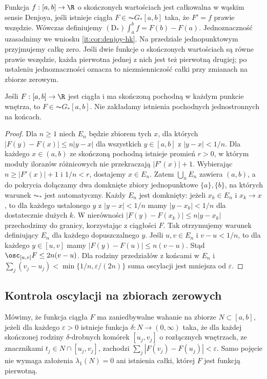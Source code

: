 \begin{definicja}\label{it:def:denjoy-narrow}
Funkcja $f:[a,b]\to\R$ o skończonych wartościach jest całkowalna w wąskim sensie Denjoya, jeśli istnieje ciągła $F\in\AC G_*[a,b]$ taka, że $F'=f$ prawie wszędzie. Wówczas definiujemy $(\mathrm D_*)\int_a^b f=F(b)-F(a)$. Jednoznaczność uzasadnimy we wniosku \ref{it:cor:denjoy-hk}. Na przedziale jednopunktowym przyjmujemy całkę zero. Jeśli dwie funkcje o skończonych wartościach są równe prawie wszędzie, każda pierwotna jednej z nich jest też pierwotną drugiej; po ustaleniu jednoznaczności oznacza to niezmienniczość całki przy zmianach na zbiorze zerowym.
\end{definicja}
\begin{twierdzenie}\label{it:thm:differentiable-acgstar}
Jeśli $F:[a,b]\to\R$ jest ciągła i ma skończoną pochodną w każdym punkcie wnętrza, to $F\in\AC G_*[a,b]$. Nie zakładamy istnienia pochodnych jednostronnych na końcach.
\end{twierdzenie}
\begin{proof}
Dla $n\ge1$ niech $E_n$ będzie zbiorem tych $x$, dla których $|F(y)-F(x)|\le n|y-x|$ dla wszystkich $y\in[a,b]$ z $|y-x|<1/n$. Dla każdego $x\in(a,b)$ ze skończoną pochodną istnieje promień $r>0$, w którym moduły ilorazów różnicowych nie przekraczają $|F'(x)|+1$. Wybierając $n\ge |F'(x)|+1$ i $1/n<r$, dostajemy $x\in E_n$. Zatem $\bigcup_n E_n$ zawiera $(a,b)$, a do pokrycia dołączamy dwa domknięte zbiory jednopunktowe $\{a\},\{b\}$, na których warunek $\AC_*$ jest automatyczny. Każdy $E_n$ jest domknięty: jeżeli $x_k\in E_n$ i $x_k\to x$, to dla każdego ustalonego $y$ z $|y-x|<1/n$ mamy $|y-x_k|<1/n$ dla dostatecznie dużych $k$. W nierówności $|F(y)-F(x_k)|\le n|y-x_k|$ przechodzimy do granicy, korzystając z ciągłości $F$. Tak otrzymujemy warunek definiujący $E_n$ dla każdego dopuszczalnego $y$. Jeśli $u,v\in E_n$ i $v-u<1/n$, to dla każdego $y\in[u,v]$ mamy $|F(y)-F(u)|\le n(v-u)$. Stąd $\osc_{[u,v]}F\le2n(v-u)$. Dla rodziny przedziałów z końcami w $E_n$ i $\sum_j(v_j-u_j)<\min\{1/n,\varepsilon/(2n)\}$ suma oscylacji jest mniejsza od $\varepsilon$.
\end{proof}
\subsection{Kontrola oscylacji na zbiorach zerowych}
Mówimy, że funkcja ciągła $F$ ma zaniedbywalne wahanie
na zbiorze $N\subset[a,b]$, jeżeli dla każdego
$\varepsilon>0$ istnieje funkcja $\delta:N\to(0,\infty)$
taka, że dla każdej skończonej rodziny
$\delta$-drobnych komórek $[u_j,v_j]$ o rozłącznych
wnętrzach, ze znacznikami $t_j\in N\cap[u_j,v_j]$,
zachodzi $\sum_j|F(v_j)-F(u_j)|<\varepsilon$.
Samo pojęcie nie wymaga założenia $\lambda_1(N)=0$
ani istnienia całki, której $F$ jest funkcją pierwotną.

